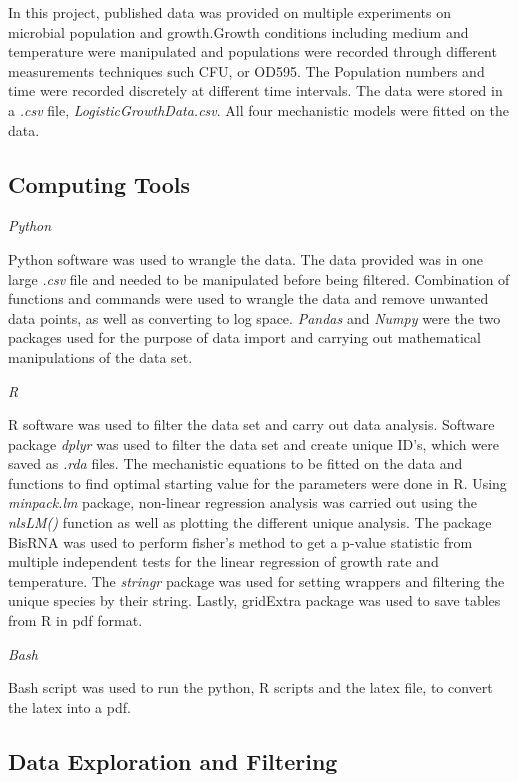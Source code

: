 
In this project, published data was provided on multiple experiments on microbial population and growth.Growth conditions including medium and temperature were manipulated and populations were recorded through different measurements techniques such CFU, or OD595. The Population numbers and time were recorded discretely at different time intervals. The data were stored in a \textit{.csv} file, \textit{LogisticGrowthData.csv}. All four mechanistic models were fitted on the data.

\subsection{Computing Tools}
\textit{Python}

Python software was used to wrangle the data. The data provided was in one large \textit{.csv} file and needed to be manipulated before being filtered. Combination of functions and commands were used to wrangle the data and remove unwanted data points, as well as converting to log space. \textit{Pandas} and \textit{Numpy} were the two packages used for the purpose of data import and carrying out mathematical manipulations of the data set.

\textit{R}

R software was used to filter the data set and carry out data analysis. Software package \textit{dplyr} was used to filter the data set and create unique ID’s, which were saved as \textit{.rda} files. The mechanistic equations to be fitted on the data and functions to find optimal starting value for the parameters were done in R. Using \textit{minpack.lm} package, non-linear regression analysis was carried out using the \textit{nlsLM()} function as well as plotting the different unique analysis. The package BisRNA was used to perform fisher's method to get a p-value statistic from multiple independent tests for the linear regression of growth rate and temperature. The \textit{stringr} package was used for setting wrappers and filtering the unique species by their string. Lastly, gridExtra package was used to save tables from R in pdf format.

\textit{Bash}

Bash script was used to run the python, R scripts and the latex file, to convert the latex into a pdf.

\subsection{Data Exploration and Filtering}

